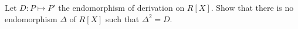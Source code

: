 Let $D: P \mapsto P'$ the endomorphism of derivation on $R[X]$. Show that there is no endomorphism $\Delta$ of $R[X]$ such that $\Delta^2 = D$.